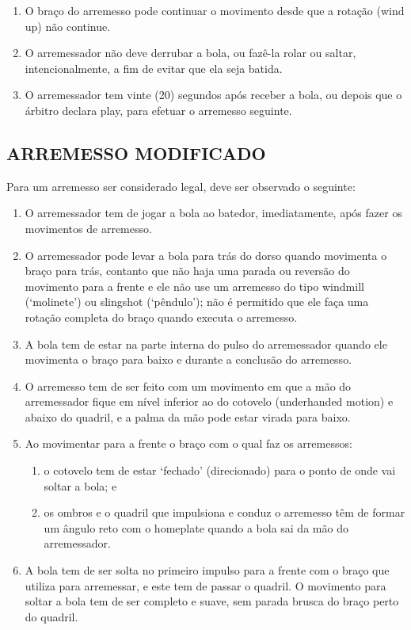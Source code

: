 \begin{multicols}{2}
\begin{enumerate}[label=\alph*)]
		\item  O bra\c{c}o do arremesso pode continuar o movimento desde que a rota\c{c}\~ao (wind up) n\~ao continue. 
		
		\item  O arremessador n\~ao deve derrubar a bola, ou faz\^e-la rolar ou saltar, 
		intencionalmente, a fim de evitar que ela seja batida. 
		
		\item  O arremessador tem vinte (20) segundos ap\'os receber a bola, ou depois que o 
		\'arbitro declara \gls{play}, para efetuar o arremesso seguinte. 
	\end{enumerate}
	
	\subsection{ARREMESSO MODIFICADO} 
	Para um arremesso ser considerado legal, deve ser observado o seguinte: 
	\begin{enumerate}[label=\alph*)]
		\item O arremessador tem de jogar a bola ao batedor, imediatamente, ap\'os fazer os 
		movimentos de arremesso. 
		
		\item  O arremessador pode levar a bola para tr\'as do dorso quando movimenta o bra\c{c}o 
		para tr\'as, contanto que n\~ao haja uma parada ou revers\~ao do movimento para a frente 
		e ele n\~ao use um arremesso do tipo \gls{windmill} (‘molinete') ou \gls{slingshot} (‘p\^endulo'); 
		n\~ao \'e permitido que ele fa\c{c}a uma rota\c{c}\~ao completa do bra\c{c}o quando executa o 
		arremesso. 
		
		\item  A bola tem de estar na parte interna do pulso do arremessador quando ele 
		movimenta o bra\c{c}o para baixo e durante a conclus\~ao do arremesso. 
		
		\item  O arremesso tem de ser feito com um movimento em que a m\~ao do arremessador 
		fique em n\'ivel inferior ao do cotovelo (\gls{underhanded motion}) e abaixo do quadril, e a 
		palma da m\~ao pode estar virada para baixo. 
		
		\item  Ao movimentar para a frente o bra\c{c}o com o qual faz os arremessos: 
		\begin{enumerate}[label=\roman* -]
			\item  o cotovelo tem de estar ‘fechado' (direcionado) para o ponto de onde vai soltar a 
			bola; e 
			\item  os ombros e o quadril que impulsiona e conduz o arremesso t\^em de formar um \^angulo reto com o \gls{homeplate} quando a bola sai da m\~ao do arremessador. 
		\end{enumerate}
		\item  A bola tem de ser solta no primeiro impulso para a frente com o bra\c{c}o que utiliza para arremessar, e este tem de passar o quadril. O movimento para soltar a bola tem de ser completo e suave, sem parada brusca do bra\c{c}o perto do quadril. 
		

\end{enumerate}
\end{multicols}

